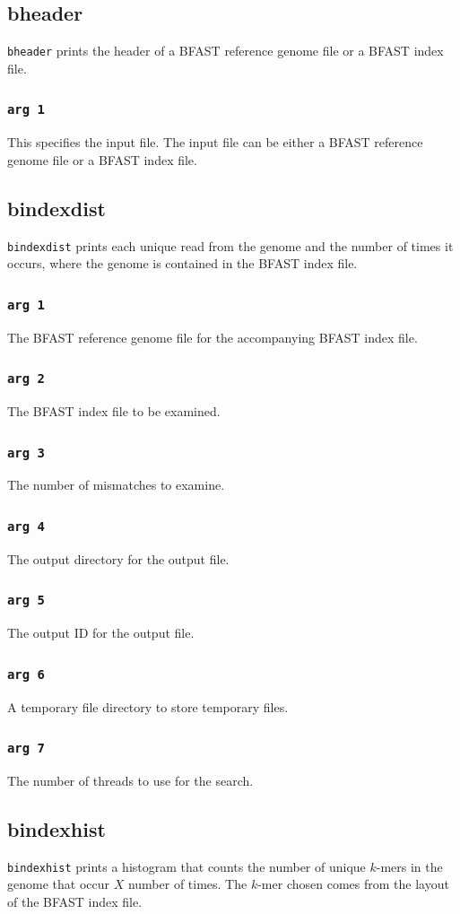 \documentclass[a4paper,12pt]{book}
\newcommand{\TT}[1]{{\tt #1}} %
\newcommand{\BRGF}{BFAST reference genome file} %
\newcommand{\BIF}{BFAST index file} %
\begin{document}
\subsection{bheader}
\label{sec:bheader}
\TT{bheader} prints the header of a \BRGF{} or a \BIF{}.
\subsubsection{\TT{arg 1}}
This specifies the input file.  
The input file can be either a \BRGF{} or a \BIF{}.

\subsection{bindexdist}
\label{sec:bindexdist}
\TT{bindexdist} prints each unique read from the genome and the number of times it occurs, where the genome is contained in the \BIF{}.
\subsubsection{\TT{arg 1}}
The \BRGF{} for the accompanying \BIF{}.
\subsubsection{\TT{arg 2}}
The \BIF{} to be examined.
\subsubsection{\TT{arg 3}}
The number of mismatches to examine.
\subsubsection{\TT{arg 4}}
The output directory for the output file.
\subsubsection{\TT{arg 5}}
The output ID for the output file.
\subsubsection{\TT{arg 6}}
A temporary file directory to store temporary files.
\subsubsection{\TT{arg 7}}
The number of threads to use for the search.

\subsection{bindexhist}
\label{sec:bindexhist}
\TT{bindexhist} prints a histogram that counts the number of unique $k$-mers in the genome that occur $X$ number of
times.  
The $k$-mer chosen comes from the layout of the \BIF{}.
\end{document}
